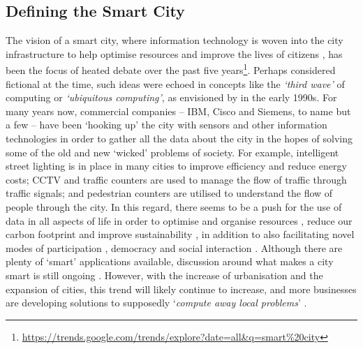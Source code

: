 \subsection{Defining the Smart City}
The vision of a smart city, where information technology is woven into the city infrastructure to help optimise resources and improve the lives of citizens \citep{chourabi_understanding_2012,ratti_city_2016}, has been the focus of heated debate over the past five years\footnote{\url{https://trends.google.com/trends/explore?date=all&q=smart\%20city}}. Perhaps considered fictional at the time, such ideas were echoed in concepts like the \textit{`third wave'} of computing or \textit{`ubiquitous computing'}, as envisioned by \citet{weiser_computer_1991,weiser_computer_1993} in the early 1990s. For many years now, commercial companies -- IBM, Cisco and Siemens, to name but a few -- have been `hooking up' the city with sensors and other information technologies in order to gather all the data about the city in the hopes of solving some of the old and new `wicked' problems of society. For example, intelligent street lighting is in place in many cities to improve efficiency and reduce energy costs; CCTV and traffic counters are used to manage the flow of traffic through traffic signals; and pedestrian counters are utilised to understand the flow of people through the city. In this regard, there seems to be a push for the use of data in all aspects of life in order to optimise and organise resources \citep{batty_big_2013,calvillo_energy_2016}, reduce our carbon footprint \citep{li_optimal_2015,pierangeli_health_2020,zubelzu_urban_2015} and improve sustainability \citep{vilajosana_bootstrapping_2013}, in addition to also facilitating novel modes of participation \citep{tenney_data-driven_2016}, democracy and social interaction \citep{ tan_social-network-sourced_2013,baack_datafication_2015}. Although there are plenty of `smart' applications available, discussion around what makes a city smart is still ongoing \citep{klein_smart_2008,foth_handbook_2009,nam_smart_2011,su_smart_2011,dameri_smart_2013}. However, with the increase of urbanisation and the expansion of cities, this trend will likely continue to increase, and more businesses are developing solutions to supposedly `\textit{compute away local problems}' \citep{townsend_smart_2013}.

